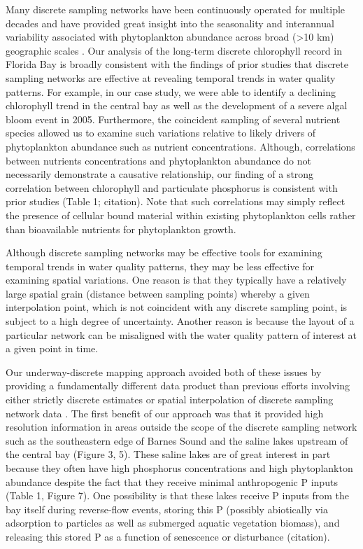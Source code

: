 \documentclass[review]{elsarticle}
\begin{document}
Many discrete sampling networks have been continuously operated for multiple decades and have provided great insight into the seasonality and interannual variability associated with phytoplankton abundance across broad (>10 km) geographic scales \citep{cloern_patterns_2010}. Our analysis of the long-term discrete chlorophyll record in Florida Bay is broadly consistent with the findings of prior studies that discrete sampling networks are effective at revealing temporal trends in water quality patterns. For example, in our case study, we were able to identify a declining chlorophyll trend in the central bay as well as the development of a severe algal bloom event in 2005. Furthermore, the coincident sampling of several nutrient species allowed us to examine such variations relative to likely drivers of phytoplankton abundance such as nutrient concentrations. Although, correlations between nutrients concentrations and phytoplankton abundance do not necessarily demonstrate a causative relationship, our finding of a strong correlation between chlorophyll and particulate phosphorus is consistent with prior studies (Table 1; citation). Note that such correlations may simply reflect the presence of cellular bound material within existing phytoplankton cells rather than bioavailable nutrients for phytoplankton growth. 

Although discrete sampling networks may be effective tools for examining temporal trends in water quality patterns, they may be less effective for examining spatial variations. One reason is that they typically have a relatively large spatial grain (distance between sampling points) whereby a given interpolation point, which is not coincident with any discrete sampling point, is subject to a high degree of uncertainty. Another reason is because the layout of a particular network can be misaligned with the water quality pattern of interest at a given point in time. 

Our underway-discrete mapping approach avoided both of these issues by providing a fundamentally different data product than previous efforts involving either strictly discrete estimates or spatial interpolation of discrete sampling network data . The first benefit of our approach was that it provided high resolution information in areas outside the scope of the discrete sampling network such as the southeastern edge of Barnes Sound and the saline lakes upstream of the central bay (Figure 3, 5). These saline lakes are of great interest in part because they often have high phosphorus concentrations and high phytoplankton abundance despite the fact that they receive minimal anthropogenic P inputs (Table 1, Figure 7). One possibility is that these lakes receive P inputs from the bay itself during reverse-flow events, storing this P (possibly abiotically via adsorption to particles as well as submerged aquatic vegetation biomass), and releasing this stored P as a function of senescence or disturbance (citation).
\end{document}
